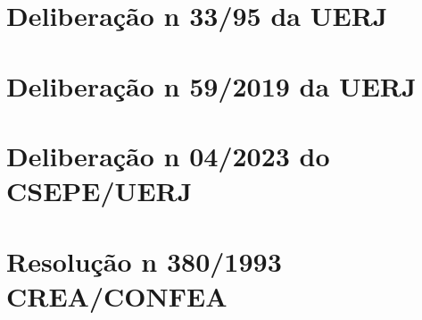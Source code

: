 \documentclass[12pt,a4paper]{article}
\begin{document}
\section{Deliberação n\textordmasculine{} 33/95 da UERJ}
\label{delib3395}

\section{Deliberação n\textordmasculine{} 59/2019 da UERJ}
\label{delib592019}

\section{Deliberação n\textordmasculine{} 04/2023 do CSEPE/UERJ}
\label{del4}

\section{Resolução n\textordmasculine{} 380/1993 CREA/CONFEA}
\label{confea1993}

\end{document}

